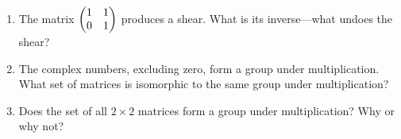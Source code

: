 \documentclass[../gatm_answers.tex]{subfiles}
\begin{document}
\begin{enumerate}
\begin{multicols}{4}
\begin{enumerate}
\item ${P,R}$
\item ${Q,R}$
\item ${P,Q,R}.$
\end{enumerate}
\end{multicols}
\item The matrix $\begin{pmatrix} 1 & 1 \\ 0 & 1 \end{pmatrix}$ produces a shear. What is its inverse---what undoes the shear?
\item The complex numbers, excluding zero, form a group under multiplication. What set of matrices is isomorphic to the same group under multiplication?
\item Does the set of all $2\times 2$ matrices form a group under multiplication? Why or why not?
\end{enumerate}
\end{document}
